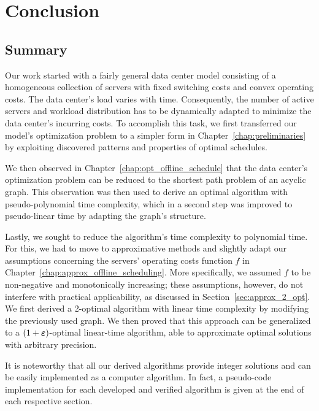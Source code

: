 
\chapter{Conclusion}\label{chap:conclusion}

\section{Summary}
Our work started with a fairly general data center model consisting of a homogeneous collection of servers with fixed switching costs and convex operating costs. The data center's load varies with time. Consequently, the number of active servers and workload distribution has to be dynamically adapted to minimize the data center's incurring costs. To accomplish this task, we first transferred our model's optimization problem to a simpler form in Chapter~\ref{chap:preliminaries} by exploiting discovered patterns and properties of optimal schedules. 

We then observed in Chapter~\ref{chap:opt_offline_schedule} that the data center's optimization problem can be reduced to the shortest path problem of an acyclic graph. This observation was then used to derive an optimal algorithm with pseudo-polynomial time complexity, which in a second step was improved to pseudo-linear time by adapting the graph's structure.

Lastly, we sought to reduce the algorithm's time complexity to polynomial time. For this, we had to move to approximative methods and slightly adapt our assumptions concerning the servers' operating costs function $f$ in Chapter~\ref{chap:approx_offline_scheduling}. More specifically, we assumed $f$ to be non-negative and monotonically increasing; these assumptions, however, do not interfere with practical applicability, as discussed in Section~\ref{sec:approx_2_opt}. We first derived a 2-optimal algorithm with linear time complexity by modifying the previously used graph. We then proved that this approach can be generalized to a $(1+\boldsymbol\varepsilon)$-optimal linear-time algorithm, able to approximate optimal solutions with arbitrary precision.

It is noteworthy that all our derived algorithms provide integer solutions and can be easily implemented as a computer algorithm. In fact, a pseudo-code implementation for each developed and verified algorithm is given at the end of each respective section.

